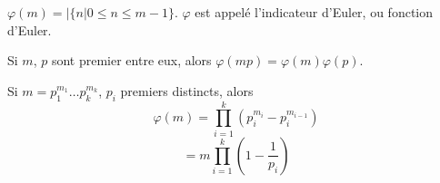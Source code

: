 \documentclass[12pt,a4paper]{article}
\begin{document}
\begin{flushleft}
\begin{rap}
$\varphi (m) = | \{ n | 0 \leqslant n \leqslant m-1 \}$. $\varphi$ est appelé l'indicateur d'Euler, ou fonction d'Euler.
\end{rap}

\begin{prop}
Si $m$, $p$ sont premier entre eux, alors $\varphi (m p) = \varphi (m) \varphi (p)$.
\end{prop}

\begin{cor}
Si $m = p_1^{m_1} \ldots p_k^{m_k}$, $p_i$ premiers distincts, alors 
$$ \varphi (m) = \prod_{i = 1}^{k} (p_i^{m_i} - p_i^{m_{i-1}})$$
$$= m \prod_{i = 1}^{k} (1-\frac{1}{p_i}) $$
\end{cor}





\end{flushleft}


 
\end{document}
